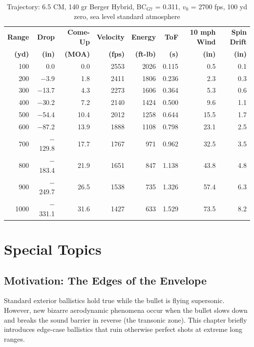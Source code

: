 \documentclass[11pt,twoside,openright]{report}
\begin{document}
\begin{table}[H]
\centering
\caption{Trajectory: 6.5 CM, 140 gr Berger Hybrid, BC$_{\text{G7}}$ = 0.311, $v_0$ = 2700 fps, 100 yd zero, sea level standard atmosphere}
\label{tab:drop_65cm}
\small
\begin{tabular}{@{}rrrrrrrr@{}}
\toprule
\textbf{Range} & \textbf{Drop} & \textbf{Come-Up} & \textbf{Velocity} & \textbf{Energy} & \textbf{ToF} & \textbf{10 mph Wind} & \textbf{Spin Drift} \\
\textbf{(yd)} & \textbf{(in)} & \textbf{(MOA)} & \textbf{(fps)} & \textbf{(ft-lb)} & \textbf{(s)} & \textbf{(in)} & \textbf{(in)} \\
\midrule
100 & 0.0 & 0.0 & 2553 & 2026 & 0.115 & 0.5 & 0.1 \\
200 & $-$3.9 & 1.8 & 2411 & 1806 & 0.236 & 2.3 & 0.3 \\
300 & $-$13.7 & 4.3 & 2273 & 1606 & 0.364 & 5.3 & 0.6 \\
400 & $-$30.2 & 7.2 & 2140 & 1424 & 0.500 & 9.6 & 1.1 \\
500 & $-$54.4 & 10.4 & 2012 & 1258 & 0.644 & 15.5 & 1.7 \\
600 & $-$87.2 & 13.9 & 1888 & 1108 & 0.798 & 23.1 & 2.5 \\
700 & $-$129.8 & 17.7 & 1767 & 971 & 0.962 & 32.5 & 3.5 \\
800 & $-$183.4 & 21.9 & 1651 & 847 & 1.138 & 43.8 & 4.8 \\
900 & $-$249.7 & 26.5 & 1538 & 735 & 1.326 & 57.4 & 6.3 \\
1000 & $-$331.1 & 31.6 & 1427 & 633 & 1.529 & 73.5 & 8.2 \\
\bottomrule
\end{tabular}
\end{table}


\chapter{Special Topics}
\label{ch:special}

\section{Motivation: The Edges of the Envelope}

Standard exterior ballistics hold true while the bullet is flying supersonic. However, new bizarre aerodynamic phenomena occur when the bullet slows down and breaks the sound barrier in reverse (the transonic zone). This chapter briefly introduces edge-case ballistics that ruin otherwise perfect shots at extreme long ranges.
\end{document}
